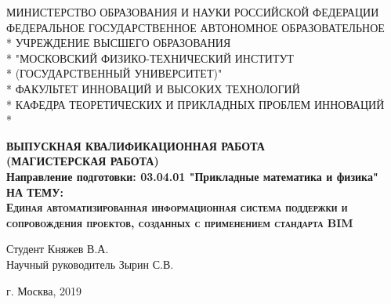 \begin{titlepage}
\newpage

\begin{center}
\small МИНИСТЕРСТВО ОБРАЗОВАНИЯ И НАУКИ РОССИЙСКОЙ ФЕДЕРАЦИИ \\
\vspace{1cm}
\small ФЕДЕРАЛЬНОЕ ГОСУДАРСТВЕННОЕ АВТОНОМНОЕ ОБРАЗОВАТЕЛЬНОЕ \\*
\small УЧРЕЖДЕНИЕ ВЫСШЕГО ОБРАЗОВАНИЯ \\*
\small "МОСКОВСКИЙ ФИЗИКО-ТЕХНИЧЕСКИЙ ИНСТИТУТ \\*
\small (ГОСУДАРСТВЕННЫЙ УНИВЕРСИТЕТ)" \\*
\vspace{1cm}
\small ФАКУЛЬТЕТ ИННОВАЦИЙ И ВЫСОКИХ ТЕХНОЛОГИЙ \\*
\small КАФЕДРА ТЕОРЕТИЧЕСКИХ И ПРИКЛАДНЫХ ПРОБЛЕМ ИННОВАЦИЙ \\*
\hrulefill
\end{center}

\vspace{4em}

\begin{center}
\textbf{ВЫПУСКНАЯ КВАЛИФИКАЦИОННАЯ РАБОТА} \\
\vspace{1em}
\small \textbf{(МАГИСТЕРСКАЯ РАБОТА)} \\
\vspace{1em}
\small \textbf{Направление подготовки: 03.04.01 "Прикладные математика и физика"} \\
\vspace{1em}
\textsc{\textbf{НА ТЕМУ:}} \\
\vspace{2em}
\large \textsc{\textbf{Единая автоматизированная информационная система поддержки и сопровождения проектов, созданных с применением стандарта BIM}}
\end{center}

\vspace{6em}

\begin{flushleft}
Студент \hrulefill Княжев В.А. \\
\vspace{1em}
Научный руководитель \hrulefill Зырин С.В.\\
\vspace{1em}
\end{flushleft}

\vspace{\fill}

\begin{center}
г. Москва, 2019
\end{center}

\end{titlepage}